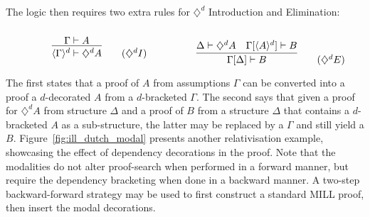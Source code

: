 The logic then requires two extra rules for $\diamondsuit^d$ Introduction and Elimination:

\begin{align*}
    \begin{minipage}{0.5\textwidth}
	\[
        \infer{\langle \Gamma \rangle^d \vdash \diamondsuit^d A}{\Gamma \vdash A}\tag{$\diamondsuit^d I$}
    \]
    \end{minipage}
    \begin{minipage}{0.5\textwidth}
    \[
        \infer{\Gamma [\Delta] \vdash B}{
        \Delta \vdash \diamondsuit^d A
        &
        \Gamma[\langle A \rangle^d] \vdash B
        }\tag{$\diamondsuit^d E$}
    \]
    \end{minipage}
\end{align*}

The first states that a proof of $A$ from assumptions $\Gamma$ can be converted into a proof a $d$-decorated $A$ from a $d$-bracketed $\Gamma$.
The second says that given a proof for $\diamondsuit^d A$ from structure $\Delta$ and a proof of $B$ from a structure $\Delta$ that contains a $d$-bracketed $A$ as a sub-structure, the latter may be replaced by a $\Gamma$ and still yield a $B$.
Figure~\ref{fig:ill_dutch_modal} presents another relativisation example, showcasing the effect of dependency decorations in the proof.
Note that the modalities do not alter proof-search when performed in a forward manner, but require the dependency bracketing when done in a backward manner.
A two-step backward-forward strategy may be used to first construct a standard MILL proof, then insert the modal decorations.

